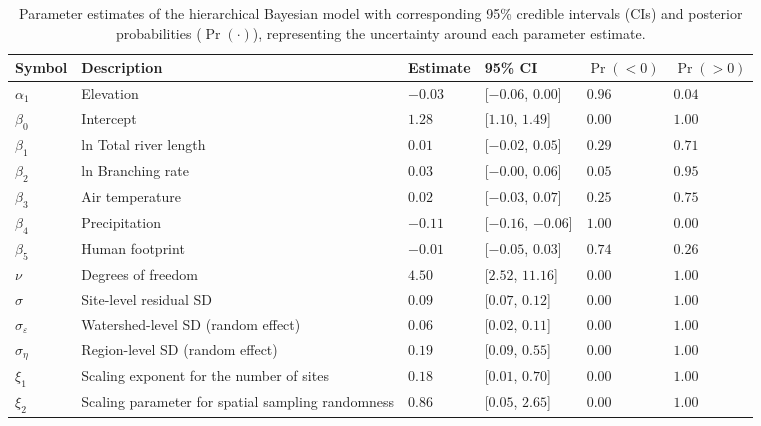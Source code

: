 \begin{table}[ht]
\centering
\caption{Parameter estimates of the hierarchical Bayesian model 
             with corresponding 95\% credible intervals (CIs) and 
             posterior probabilities ($\Pr(\cdot)$), 
             representing the uncertainty around each parameter estimate.
             \label{tab:parms-est}} 
\begingroup\small
\begin{tabularx}{\textwidth}{llllll}
  \hline
Symbol & Description & Estimate & 95\% CI & $\Pr(< 0)$ & $\Pr(> 0)$ \\ 
  \hline
$\alpha_1$ & Elevation & $-0.03$ & [$-0.06$, $0.00$] & $0.96$ & $0.04$ \\ 
  $\beta_0$ & Intercept & $1.28$ & [$1.10$, $1.49$] & $0.00$ & $1.00$ \\ 
  $\beta_1$ & ln Total river length & $0.01$ & [$-0.02$, $0.05$] & $0.29$ & $0.71$ \\ 
  $\beta_2$ & ln Branching rate & $0.03$ & [$-0.00$, $0.06$] & $0.05$ & $0.95$ \\ 
  $\beta_3$ & Air temperature & $0.02$ & [$-0.03$, $0.07$] & $0.25$ & $0.75$ \\ 
  $\beta_4$ & Precipitation & $-0.11$ & [$-0.16$, $-0.06$] & $1.00$ & $0.00$ \\ 
  $\beta_5$ & Human footprint & $-0.01$ & [$-0.05$, $0.03$] & $0.74$ & $0.26$ \\ 
  $\nu$ & Degrees of freedom & $4.50$ & [$2.52$, $11.16$] & $0.00$ & $1.00$ \\ 
  $\sigma$ & Site-level residual SD & $0.09$ & [$0.07$, $0.12$] & $0.00$ & $1.00$ \\ 
  $\sigma_{\varepsilon}$ & Watershed-level SD (random effect) & $0.06$ & [$0.02$, $0.11$] & $0.00$ & $1.00$ \\ 
  $\sigma_{\eta}$ & Region-level SD (random effect) & $0.19$ & [$0.09$, $0.55$] & $0.00$ & $1.00$ \\ 
  $\xi_{1}$ & Scaling exponent for the number of sites & $0.18$ & [$0.01$, $0.70$] & $0.00$ & $1.00$ \\ 
  $\xi_{2}$ & Scaling parameter for spatial sampling randomness & $0.86$ & [$0.05$, $2.65$] & $0.00$ & $1.00$ \\ 
   \hline
\end{tabularx}
\endgroup
\end{table}
